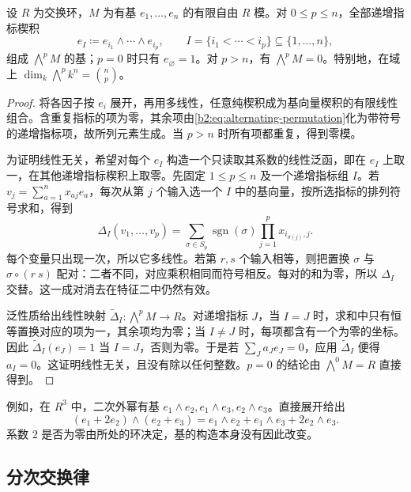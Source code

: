 \begin{theorem}[有限自由模的外幂基]\label{b2:thm:exterior-power-basis}
	设 \(R\) 为交换环，\(M\) 为有基 \(e_1,\ldots,e_n\) 的有限自由 \(R\) 模。对 \(0\le p\le n\)，全部递增指标楔积
	\[
		e_I\coloneqq e_{i_1}\wedge\cdots\wedge e_{i_p}, \qquad I=\{i_1<\cdots<i_p\}\subseteq\{1,\ldots,n\},
	\]
	组成 \(\bigwedge^pM\) 的基；\(p=0\) 时只有 \(e_{\varnothing}=1\)。对 \(p>n\)，有 \(\bigwedge^pM=0\)。特别地，在域上 \(\dim_k\bigwedge^p k^n=\binom np\)。
\end{theorem}
\begin{proof}
	将各因子按 \(e_i\) 展开，再用多线性，任意纯楔积成为基向量楔积的有限线性组合。含重复指标的项为零，其余项由\eqref{b2:eq:alternating-permutation}化为带符号的递增指标项，故所列元素生成。当 \(p>n\) 时所有项都重复，得到零模。

	为证明线性无关，希望对每个 \(e_I\) 构造一个只读取其系数的线性泛函，即在 \(e_I\) 上取一，在其他递增指标楔积上取零。先固定 \(1\le p\le n\) 及一个递增指标组 \(I\)。若 \(v_j=\sum_{a=1}^n x_{aj}e_a\)，每次从第 \(j\) 个输入选一个 \(I\) 中的基向量，按所选指标的排列符号求和，得到
	\[
		\Delta_I(v_1,\ldots,v_p) =\sum_{\sigma\in S_p}\operatorname{sgn}(\sigma) \prod_{j=1}^p x_{i_{\sigma(j)},j}.
	\]
	每个变量只出现一次，所以它多线性。若第 \(r,s\) 个输入相等，则把置换 \(\sigma\) 与 \(\sigma\circ(r\ s)\) 配对：二者不同，对应乘积相同而符号相反。每对的和为零，所以 \(\Delta_I\) 交替。这一成对消去在特征二中仍然有效。

	泛性质给出线性映射 \(\widetilde\Delta_I:\bigwedge^pM\to R\)。对递增指标 \(J\)，当 \(I=J\) 时，求和中只有恒等置换对应的项为一，其余项均为零；当 \(I\ne J\) 时，每项都含有一个为零的坐标。因此 \(\widetilde\Delta_I(e_J)=1\) 当 \(I=J\)，否则为零。于是若 \(\sum_J a_Je_J=0\)，应用 \(\widetilde\Delta_I\) 便得 \(a_I=0\)。这证明线性无关，且没有除以任何整数。\(p=0\) 的结论由 \(\bigwedge^0M=R\) 直接得到。
\end{proof}

例如，在 \(R^3\) 中，二次外幂有基 \(e_1\wedge e_2,e_1\wedge e_3,e_2\wedge e_3\)。直接展开给出
\[
	(e_1+2e_2)\wedge(e_2+e_3) =e_1\wedge e_2+e_1\wedge e_3+2e_2\wedge e_3.
\]
系数 \(2\) 是否为零由所处的环决定，基的构造本身没有因此改变。

\subsection{分次交换律}
\label{b2:subsec:0902:02}

